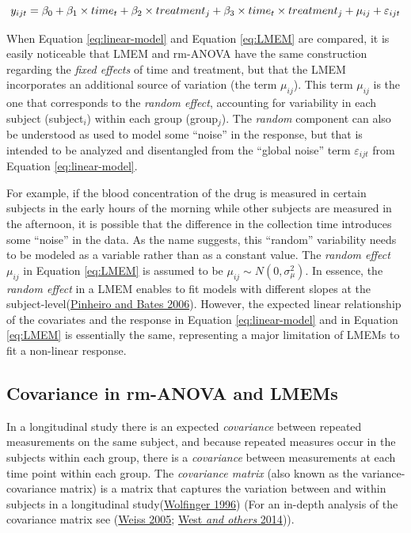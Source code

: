 \documentclass[
]{article}
\begin{document}
\begin{equation}
y_{ijt} = \beta_0+ \beta_1 \times time_{t} + \beta_2 \times treatment_{j} + \beta_3 \times time_{t}\times treatment_{j}+\mu_{ij} +\varepsilon_{ijt}\\ 
\label{eq:LMEM}
\end{equation}

When Equation \eqref{eq:linear-model} and Equation \eqref{eq:LMEM} are compared, it is easily noticeable that LMEM and rm-ANOVA have the same construction regarding the \emph{fixed effects} of time and treatment, but that the LMEM incorporates an additional source of variation (the term \(\mu_{ij}\)). This term \(\mu_{ij}\) is the one that corresponds to the \emph{random effect}, accounting for variability in each subject (subject\(_i\)) within each group (group\(_j\)). The \emph{random} component can also be understood as used to model some ``noise'' in the response, but that is intended to be analyzed and disentangled from the ``global noise'' term \(\varepsilon_{ijt}\) from Equation \eqref{eq:linear-model}.

For example, if the blood concentration of the drug is measured in certain subjects in the early hours of the morning while other subjects are measured in the afternoon, it is possible that the difference in the collection time introduces some ``noise'' in the data. As the name suggests, this ``random'' variability needs to be modeled as a variable rather than as a constant value. The \emph{random effect} \(\mu_{ij}\) in Equation \eqref{eq:LMEM} is assumed to be \(\mu_{ij} \sim N(0,\sigma^2_\mu)\). In essence, the \emph{random effect} in a LMEM enables to fit models with different slopes at the subject-level(\protect\hyperlink{ref-pinheiro2006}{Pinheiro and Bates 2006}). However, the expected linear relationship of the covariates and the response in Equation \eqref{eq:linear-model} and in Equation \eqref{eq:LMEM} is essentially the same, representing a major limitation of LMEMs to fit a non-linear response.

\hypertarget{covariance-in-rm-anova-and-lmems}{%
\subsection{Covariance in rm-ANOVA and LMEMs}\label{covariance-in-rm-anova-and-lmems}}

In a longitudinal study there is an expected \emph{covariance} between repeated measurements on the same subject, and because repeated measures occur in the subjects within each group, there is a \emph{covariance} between measurements at each time point within each group. The \emph{covariance matrix} (also known as the variance-covariance matrix) is a matrix that captures the variation between and within subjects in a longitudinal study(\protect\hyperlink{ref-wolfinger1996}{Wolfinger 1996}) (For an in-depth analysis of the covariance matrix see (\protect\hyperlink{ref-weiss2005}{Weiss 2005}; \protect\hyperlink{ref-west2014}{West \emph{and others} 2014})).
\end{document}
